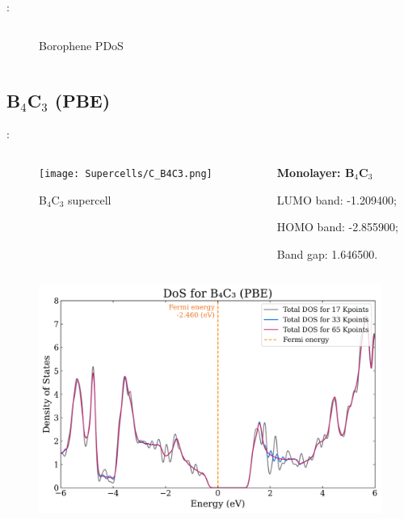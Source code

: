 \documentclass[xcolor=dvipsnames]{beamer}
\begin{document}
\begin{frame}{\insertsection: \insertsubsection}
\begin{columns}
\begin{column}{0.55\textwidth}
\begin{figure}
        \caption{Borophene PDoS}
    \end{figure}\end{column}
\end{columns}
\end{frame}

\subsection{B\texorpdfstring{$_\text{4}$}{4}C\texorpdfstring{$_\text{3}$}{3} (PBE)}
\begin{frame}{\insertsection: \insertsubsection}
\begin{columns}
    \begin{column}{0.5\textwidth}\begin{figure}
        \texttt{[image: Supercells/C\_B4C3.png]}
        \caption{B$_\text{4}$C$_\text{3}$ supercell}
    \end{figure}\end{column}
    \begin{column}{0.5\textwidth}
        \par \textbf{Monolayer: B$_\text{4}$C$_\text{3}$}
        \par\quad LUMO band: -1.209400;
        \par\quad HOMO band: -2.855900;
        \par\quad Band gap: 1.646500.
    \end{column}
\end{columns}
\begin{columns}
    \begin{column}{0.45\textwidth}\begin{figure}
        \includegraphics[width=1\textwidth]{PDoS/B4C3_dos}

\end{figure}
\end{column}
\end{columns}
\end{frame}
\end{document}
